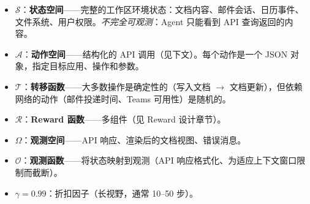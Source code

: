 \begin{itemize}
  \item $\mathcal{S}$：\textbf{状态空间}——完整的工作区环境状态：文档内容、邮件会话、日历事件、文件系统、用户权限。\emph{不完全可观测}：Agent 只能看到 API 查询返回的内容。
  \item $\mathcal{A}$：\textbf{动作空间}——结构化的 API 调用（见下文）。每个动作是一个 JSON 对象，指定目标应用、操作和参数。
  \item $\mathcal{T}$：\textbf{转移函数}——大多数操作是确定性的（写入文档 $\rightarrow$ 文档更新），但依赖网络的动作（邮件投递时间、Teams 可用性）是随机的。
  \item $\mathcal{R}$：\textbf{Reward 函数}——多组件（见 Reward 设计章节）。
  \item $\Omega$：\textbf{观测空间}——API 响应、渲染后的文档视图、错误消息。
  \item $\mathcal{O}$：\textbf{观测函数}——将状态映射到观测（API 响应格式化、为适应上下文窗口限制而截断）。
  \item $\gamma = 0.99$：折扣因子（长视野，通常 10--50 步）。
\end{itemize}


